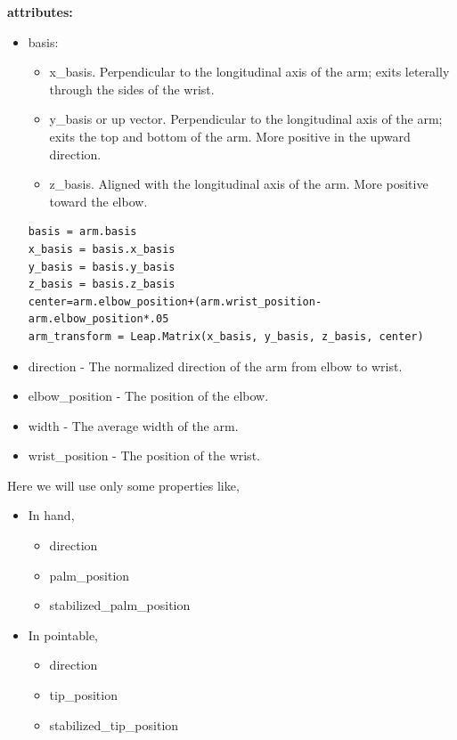 \documentclass[11pt,a4paper]{article}
\newcommand\tab[1][1cm]{\hspace*{#1}}
\begin{document}
\textbf{attributes:}
\begin{itemize}
    \item basis:\\
\tab{Basis vectors specify the orientation of an arm.}
    \begin{itemize}
        \item x\_basis. Perpendicular to the longitudinal axis of the arm; exits leterally through the sides of the wrist.
        \item y\_basis or up vector. Perpendicular to the longitudinal axis of the arm; exits the top and bottom of the arm. More positive in the upward direction.
        \item z\_basis. Aligned with the longitudinal axis of the arm. More positive toward the elbow.
    \end{itemize}
    \vspace{2cm}
    	\begin{lstlisting}
basis = arm.basis
x_basis = basis.x_basis
y_basis = basis.y_basis
z_basis = basis.z_basis
center=arm.elbow_position+(arm.wrist_position-arm.elbow_position*.05
arm_transform = Leap.Matrix(x_basis, y_basis, z_basis, center)
\end{lstlisting}
\vspace{1cm}
    \item direction - The normalized direction of the arm from elbow to wrist.
    \item elbow\_position - The position of the elbow.
    \item width - The average width of the arm.
    \item wrist\_position - The position of the wrist.
\end{itemize}
\vspace{3cm}
Here we will use only some properties like,
\begin{itemize}
    \item In hand,
    \begin{itemize}
        \item direction
        \item palm\_position
        \item stabilized\_palm\_position
    \end{itemize}
    \item In pointable,
    \begin{itemize}
        \item direction
        \item tip\_position
        \item stabilized\_tip\_position
    \end{itemize}
\end{itemize}
\end{document}
